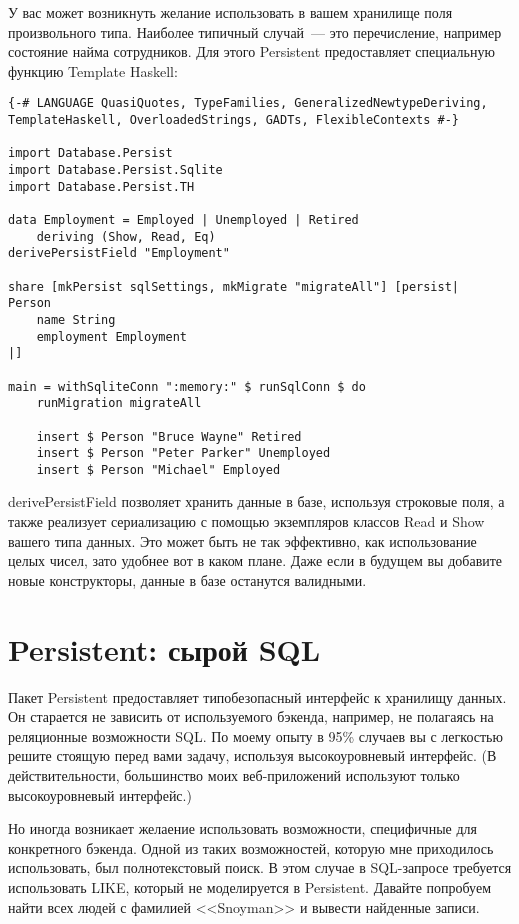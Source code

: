 У вас может возникнуть желание использовать в вашем хранилище поля произвольного типа. Наиболее типичный случай~--- это перечисление, например состояние найма сотрудников. Для этого Persistent предоставляет специальную функцию Template Haskell:

\begin{lstlisting}
{-# LANGUAGE QuasiQuotes, TypeFamilies, GeneralizedNewtypeDeriving, TemplateHaskell, OverloadedStrings, GADTs, FlexibleContexts #-}

import Database.Persist
import Database.Persist.Sqlite
import Database.Persist.TH

data Employment = Employed | Unemployed | Retired
    deriving (Show, Read, Eq)
derivePersistField "Employment"

share [mkPersist sqlSettings, mkMigrate "migrateAll"] [persist|
Person
    name String
    employment Employment
|]

main = withSqliteConn ":memory:" $ runSqlConn $ do
    runMigration migrateAll

    insert $ Person "Bruce Wayne" Retired
    insert $ Person "Peter Parker" Unemployed
    insert $ Person "Michael" Employed
\end{lstlisting}%

derivePersistField позволяет хранить данные в базе, используя строковые поля, а также реализует сериализацию с помощью экземпляров классов Read и Show вашего типа данных. Это может быть не так эффективно, как использование целых чисел, зато удобнее вот в каком плане. Даже если в будущем вы добавите новые конструкторы, данные в базе останутся валидными.

\section{Persistent: сырой SQL} %

Пакет Persistent предоставляет типобезопасный интерфейс к хранилищу данных. Он старается не зависить от используемого бэкенда, например, не полагаясь на реляционные возможности SQL. По моему опыту в 95\% случаев вы с легкостью решите стоящую перед вами задачу, используя высокоуровневый интерфейс. (В действительности, большинство моих веб-приложений используют только высокоуровневый интерфейс.)

Но иногда возникает желаение использовать возможности, специфичные для конкретного бэкенда. Одной из таких возможностей, которую мне приходилось использовать, был полнотекстовый поиск. В этом случае в SQL-запросе требуется использовать LIKE, который не моделируется в Persistent. Давайте попробуем найти всех людей с фамилией <<Snoyman>> и вывести найденные записи.

